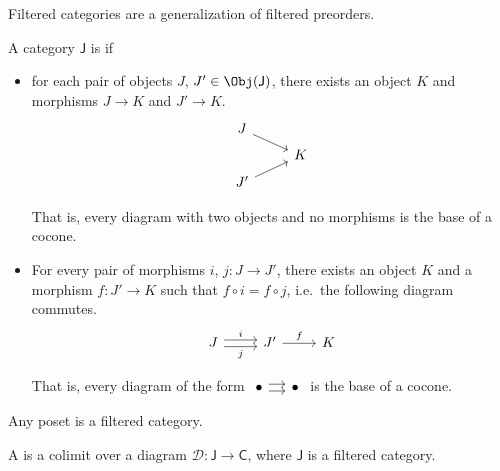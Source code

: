 \documentclass[main.tex]{subfiles}
\begin{document}
Filtered categories are a generalization of filtered preorders.

\begin{definition}
  \label{def:filteredcategory}
  A category $\mathsf{J}$ is  if
  \begin{itemize}
    \item for each pair of objects $J$, $J' \in \Obj(\mathsf{J})$, there exists an object $K$ and morphisms $J \to K$ and $J' \to K$.
      \begin{equation*}
        \begin{tikzcd}[row sep=tiny]
          J
          \arrow[dr]
          \\
          & K
          \\
          J'
          \arrow[ur]
        \end{tikzcd}
      \end{equation*}

      That is, every diagram with two objects and no morphisms is the base of a cocone.

    \item For every pair of morphisms $i$, $j\colon J \to J'$, there exists an object $K$ and a morphism $f\colon J' \to K$ such that $f \circ i = f \circ j$, i.e.\ the following diagram commutes.
      \begin{equation*}
        \begin{tikzcd}[row sep=tiny]
          J
          \arrow[r, shift left, "i"]
          \arrow[r, shift right, swap, "j"]
          & J'
          \arrow[r, "f"]
          & K
        \end{tikzcd}
      \end{equation*}

      That is, every diagram of the form $\begin{tikzcd}[column sep=small]\bullet \arrow[r, shift left] \arrow[r, shift right] & \bullet \end{tikzcd}$ is the base of a cocone.
  \end{itemize}
\end{definition}

\begin{example}
  Any poset is a filtered category.
\end{example}

\begin{definition}
  \label{def:filteredcolimit}
  A  is a colimit over a diagram $\mathcal{D}\colon \mathsf{J} \to \mathsf{C}$, where $\mathsf{J}$ is a filtered category.
\end{definition}
\end{document}
